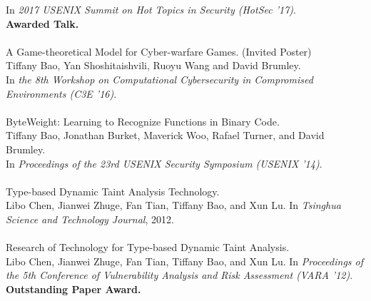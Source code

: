 \documentclass[11pt]{article}
\renewcommand{\section}[2]%
        {\pagebreak[2]\vspace{\baselineskip}%
         \phantomsection\addcontentsline{toc}{section}{#1}%
         \hspace{0in}%
         \marginpar{
         \raggedright \scshape #1}#2}
\begin{document}
In \emph{2017 USENIX Summit on Hot Topics in Security (HotSec '17)}. \\
\textbf{Awarded Talk.}
\\\\
%
A Game-theoretical Model for Cyber-warfare Games. (Invited
Poster)\\
Tiffany Bao, Yan Shoshitaishvili, Ruoyu Wang and David
Brumley. \\
In \emph{the 8th Workshop on Computational Cybersecurity in
Compromised Environments (C3E '16)}.
\\\\
%
ByteWeight: Learning to Recognize Functions in Binary Code.
\\
Tiffany Bao, Jonathan Burket, Maverick Woo, Rafael Turner,
and David Brumley.  \\
In \emph{Proceedings of the 23rd USENIX Security Symposium
(USENIX '14)}.
\\\\
%
Type-based Dynamic Taint Analysis Technology. \\
Libo Chen, Jianwei Zhuge, Fan Tian, Tiffany Bao, and Xun Lu.
In \emph{Tsinghua Science and Technology Journal}, 2012.
\\\\
%
Research of Technology for Type-based Dynamic Taint Analysis. \\
Libo Chen, Jianwei Zhuge, Fan Tian, Tiffany Bao, and Xun Lu.
In \emph{Proceedings of the 5th Conference of Vulnerability Analysis
and Risk Assessment (VARA '12)}. \\
\textbf{Outstanding Paper Award.}


\end{document}
